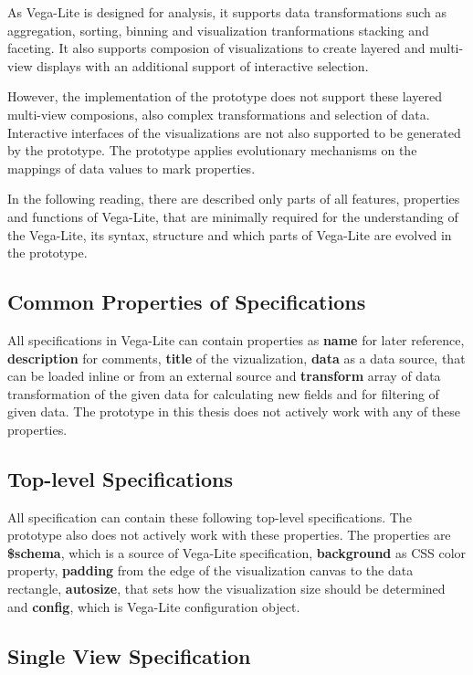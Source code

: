   As Vega-Lite is designed for analysis, it supports data transformations such as aggregation, sorting, binning and visualization tranformations stacking and faceting. It also supports composion of visualizations to create layered and multi-view displays with an additional support of interactive selection.

  However, the implementation of the prototype does not support these layered multi-view composions, also complex transformations and selection of data. Interactive interfaces of the visualizations are not also supported to be generated by the prototype. The prototype applies evolutionary mechanisms on the mappings of data values to mark properties.

  In the following reading, there are described only parts of all features, properties and functions of Vega-Lite, that are minimally required for the understanding of the Vega-Lite, its syntax, structure and which parts of Vega-Lite are evolved in the prototype.

  \subsection{Common Properties of Specifications}
  All specifications in Vega-Lite can contain properties as \textbf{name} for later reference, \textbf{description} for comments, \textbf{title} of the vizualization, \textbf{data} as a data source, that can be loaded inline or from an external source and \textbf{transform} array of data transformation of the given data for calculating new fields and for filtering of given data. The prototype in this thesis does not actively work with any of these properties.

  \subsection{Top-level Specifications}
  All specification can contain these following top-level specifications. The prototype also does not actively work with these properties. The properties are \textbf{\$schema}, which is a source of Vega-Lite specification, \textbf{background} as CSS color property, \textbf{padding} from the edge of the visualization canvas to the data rectangle, \textbf{autosize}, that sets how the visualization size should be determined and \textbf{config}, which is Vega-Lite configuration object.

  \subsection{Single View Specification}

